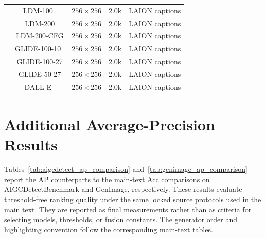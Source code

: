 \documentclass[lettersize,journal]{IEEEtran}
\begin{document}
\begin{table}[H]
\begin{tabular}{@{}c|cccc@{}}
& LDM-100~\cite{rombach2022ldm} & $256\times256$ & 2.0k & LAION captions \\
& LDM-200 & $256\times256$ & 2.0k & LAION captions \\
& LDM-200-CFG & $256\times256$ & 2.0k & LAION captions \\
& GLIDE-100-10~\cite{nichol2022glide} & $256\times256$ & 2.0k & LAION captions \\
& GLIDE-100-27 & $256\times256$ & 2.0k & LAION captions \\
& GLIDE-50-27 & $256\times256$ & 2.0k & LAION captions \\
& DALL-E~\cite{ramesh2021dalle} & $256\times256$ & 2.0k & LAION captions \\
\bottomrule
\end{tabular}
\end{table}

\clearpage
\section{Additional Average-Precision Results}

Tables~\ref{tab:aigcdetect_ap_comparison} and~\ref{tab:genimage_ap_comparison} report the AP counterparts to the main-text Acc comparisons on AIGCDetectBenchmark and GenImage, respectively. These results evaluate threshold-free ranking quality under the same locked source protocols used in the main text. They are reported as final measurements rather than as criteria for selecting models, thresholds, or fusion constants. The generator order and highlighting convention follow the corresponding main-text tables.
\end{document}
